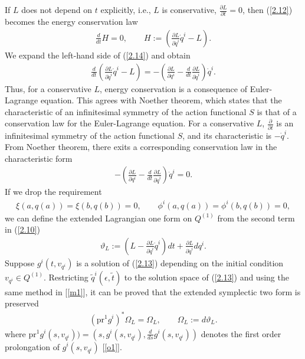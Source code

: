 \documentclass[a4paper,a4paper]{article}
\begin{document}
If $L$ does not depend on $t$ explicitly, i.e.,  $L$ is conservative, 
  $\frac{\partial L}{\partial t}=0$, then
(\ref{2.12}) becomes the energy conservation law
\begin{align}
\frac{d}{dt}H=0, \qquad H:=\left(
           \frac{\partial L}{\partial \dot{q}^i}\dot{q}^i-L\right).
\label{2.14}
\end{align}
 We expand the left-hand side of (\ref{2.14}) and obtain
\begin{align}
\frac{d}{dt}\left(
           \frac{\partial L}{\partial \dot{q}^i}\dot{q}^i-L\right)=
-\left(\frac{\partial L}{\partial q^i}-\frac{d}{dt}
          \frac{\partial L}{\partial \dot{q}^i}\right)\dot{q}^i.
\label{2.15}
\end{align}
Thus, for a conservative $L$, energy conservation is a consequence
of Euler-Lagrange equation. This agrees with Noether theorem,
which states that the  characteristic of an infinitesimal symmetry
of  the action functional $S$ is that of a conservation law for
the Euler-Lagrange equation. For a conservative $L$,
$\frac{\partial}{\partial t}$ is an infinitesimal symmetry of  the
action functional $S$, and its characteristic is $-\dot{q}^i$.
From Noether theorem, there exits a corresponding conservation law
in the characteristic form
\begin{align}
 -\left(\frac{\partial L}{\partial q^i}-\frac{d}{dt}
\frac{\partial L}{\partial \dot{q}^i}\right)\dot{q}^i=0.
\label{2.16}
\end{align}
If we drop the requirement
\begin{align}
 \xi(a, q(a))=\xi(b, q(b))=0, \qquad
 \phi^i(a, q(a))=\phi^i(b, q(b))=0,
\end{align}
we can define the extended Lagrangian one form on $Q^{(1)}$ from
the second term in (\ref{2.10})
\begin{align}
\vartheta_{L}:=\left(L-\frac{\partial L}{\partial \dot{q}^i}
           \dot{q}^i\right)dt +\frac{\partial L}{\partial \dot{q}^i}dq^i \label{2.17}.
\end{align}
Suppose $g^i(t, v_{q^i})$ is a solution of (\ref{2.13}) depending
on the initial condition $v_{q^i}\in Q^{(1)}$. Restricting
$\tilde{q}^i(\epsilon, \tilde{t})$ to the solution space of
(\ref{2.13}) and using the same method in [\ref{m1}], it can be
proved that the extended symplectic two form is preserved
\begin{align}
(\text{pr}^{1}g^i)^{*}\Omega_{L}=\Omega_{L},\qquad
\Omega_L:=d\vartheta_L. \label{2.22}
\end{align}
where $\text{pr}^{1}g^i(s, v_{q^i}))=(s,g^i(s, v_{q^i}),
\frac{d}{ds}g^i(s, v_{q^i}))$ denotes the first order prolongation
of $g^i(s, v_{q^i})$ [\ref{o1}].
\end{document}
